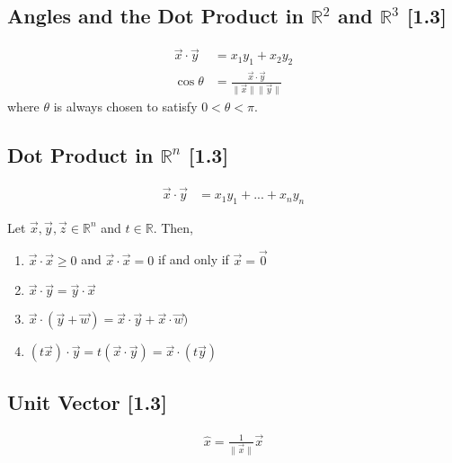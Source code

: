 \documentclass[a4paper,9pt]{extarticle}
\begin{document}
\begin{multicols*}{2}
\subsection{Angles and the Dot Product in $\mathbb{R}^2$ and $\mathbb{R}^3$ [1.3]}
\begin{equation} \label{1.3-2}
    \begin{split}
        \vec{x} \cdot \vec{y} & = x_1 y_1 + x_2 y_2 \\
        \cos{\theta} & = \frac{\vec{x} \cdot \vec{y}}{\|\vec{x}\| \|\vec{y}\|} 
    \end{split}
\end{equation}
where $\theta$ is always chosen to satisfy $0 < \theta < \pi$.


\subsection{Dot Product in $\mathbb{R}^n$ [1.3]}
\begin{equation} \label{1.3-3}
    \begin{split}
        \vec{x} \cdot \vec{y} & = x_1 y_1 + ... + x_n y_n
    \end{split}
\end{equation}

Let $\vec{x}, \vec{y}, \vec{z} \in \mathbb{R}^n$ and $t \in \mathbb{R}$. Then,
\begin{enumerate}[label=\bfseries (\arabic*)] \itemsep0pt \parskip0pt 
    \item $\vec{x} \cdot \vec{x} \geq 0$ and $\vec{x} \cdot \vec{x} = 0$ if and only if $\vec{x} = \vec{0}$
    \item $\vec{x} \cdot \vec{y} = \vec{y} \cdot \vec{x}$
    \item $\vec{x} \cdot (\vec{y} + \vec{w}) = \vec{x} \cdot \vec{y} + \vec{x} \cdot \vec{w})$
    \item $(t \vec{x}) \cdot \vec{y} = t(\vec{x} \cdot \vec{y}) = \vec{x} \cdot (t \vec{y})$
\end{enumerate}


\subsection{Unit Vector [1.3]}
\begin{equation} \label{1.3-4}
    \begin{split}
        \hat{x} = \frac{1}{\|\vec{x}\|} \vec{x}
    \end{split}
\end{equation}


\end{multicols*}
\end{document}
